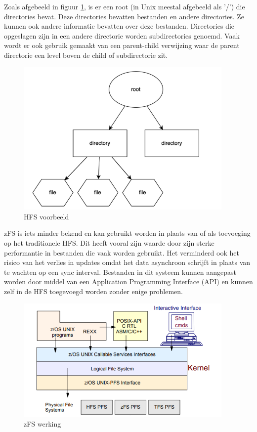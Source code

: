 Zoals afgebeeld in figuur \ref{fig:HFS}, is er een root (in Unix meestal afgebeeld als '/') die directories bevat. Deze directories bevatten bestanden en andere directories. Ze kunnen ook andere informatie bevatten over deze bestanden. Directories die opgeslagen zijn in een andere directorie worden subdirectories genoemd. Vaak wordt er ook gebruik gemaakt van een parent-child verwijzing waar de parent directorie een level boven de child of subdirectorie zit. \autocite{Codecadamy2022} \\

\begin{figure}[pt!]
    \centering
    \includegraphics[width=300pt]{./graphics/HFS.png}
    \caption{HFS voorbeeld \autocite{Codecadamy2022}}
    \label{fig:HFS}
\end{figure}

zFS is iets minder bekend en kan gebruikt worden in plaats van of als toevoeging op het traditionele HFS. Dit heeft vooral zijn waarde door zijn sterke performantie in bestanden die vaak worden gebruikt. Het verminderd ook het risico van het verlies in updates omdat het data asynchroon schrijft in plaats van te wachten op een sync interval. Bestanden in dit systeem kunnen aangepast worden door middel van een Application Programming Interface (API) en kunnen zelf in de HFS toegevoegd worden zonder enige problemen. \autocite{IBM2012} \\

\begin{figure}[pt!]
    \centering
    \includegraphics[width=300pt]{./graphics/zFS.png}
    \caption{zFS werking \autocite{IBM2012}}
    \label{fig:zFS}
\end{figure}

